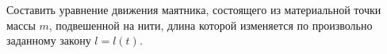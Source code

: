Составить уравнение движения маятника,
состоящего из материальной точки массы $m$,
подвешенной на нити,
длина которой изменяется по произвольно заданному закону $l = l(t)$.
